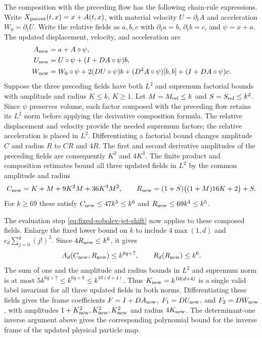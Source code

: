 \documentclass[11pt]{article}
\theoremstyle{definition}
\begin{document}
The composition with the preceding flow has the following
chain-rule expressions. Write $X_{\rm parent}(t,x)=x+A(t,x)$, with material
velocity $U=\partial_tA$ and acceleration $W_0=\partial_tU$. Write the
relative fields as $a,b,c$ with $\partial_ta=b$, $\partial_tb=c$, and
$\psi=x+a$. The updated displacement, velocity, and acceleration are
\begin{align*}
 A_{\rm new}&=a+A\circ\psi,\\
 U_{\rm new}&=U\circ\psi+(I+DA\circ\psi)b,\\
 W_{\rm new}&=W_0\circ\psi+2(DU\circ\psi)b
       +(D^2A\circ\psi)[b,b]+(I+DA\circ\psi)c.
\end{align*}
Suppose the three preceding fields have both $L^2$ and supremum factorial
bounds with amplitude and radius $K\leq k$, $K\geq1$. Let
$M=M_{\rm rel}\leq k$ and $S=S_{\rm rel}\leq k^2$.
Since $\psi$ preserves volume, each factor composed with the preceding flow retains its
$L^2$ norm before applying the derivative composition formula. The
relative displacement and velocity provide the needed supremum factors;
the relative acceleration is placed in $L^2$. Differentiating a
factorial bound changes amplitude $C$ and radius $R$ to $CR$ and $4R$.
The first and second derivative amplitudes of the preceding fields are
consequently
$K^2$ and $4K^3$. The finite product and composition estimates bound all
three updated fields in $L^2$ by the common amplitude and radius
\[
 C_{\rm new}=K+M+9K^2M+36K^3M^2,\qquad
 R_{\rm new}=(1+S)\bigl((1+M)16K+2\bigr)+S.
\]
For $k\geq69$ these satisfy
$C_{\rm new}\leq47k^5\leq k^6$ and
$R_{\rm new}\leq69k^4\leq k^5$.

The evaluation step \eqref{eq:fixed-sobolev-jet-shift} now applies to
these composed fields. Enlarge the fixed lower bound on $k$ to include
$4\max(1,d)$ and $c_d\sum_{j=0}^q(j!)^2$. Since
$4R_{\rm new}\leq k^6$, it gives
\[
 A_d(C_{\rm new},R_{\rm new})\leq k^{6q+7},\qquad
 R_d(R_{\rm new})\leq k^6.
\]
The sum of one and the amplitude and radius bounds in $L^2$ and
supremum norm is at most
$5k^{6q+7}\leq k^{6q+8}\leq k^{10(d+4)}$.
Thus $K_{\rm new}=k^{10(d+4)}$ is a single valid label invariant for
all three updated fields in both norms. Differentiating these
fields gives the frame coefficients
$F=I+DA_{\rm new}$, $F_1=DU_{\rm new}$, and $F_2=DW_{\rm new}$,
with amplitudes $1+K_{\rm new}^2,K_{\rm new}^2,K_{\rm new}^2$ and
radius $4K_{\rm new}$. The determinant-one inverse argument above gives
the corresponding polynomial bound for the inverse frame of the updated
physical particle map.
\end{document}

